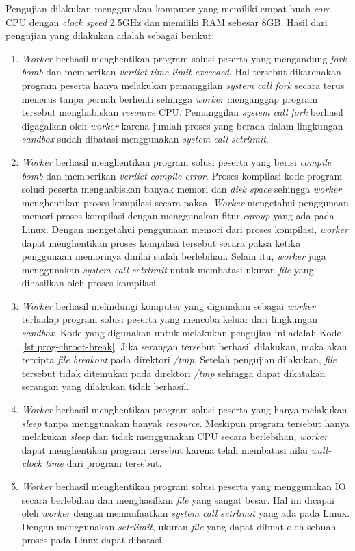 \par Pengujian dilakukan menggunakan komputer yang memiliki empat buah \textit{core} CPU dengan \textit{clock speed} 2.5GHz dan memiliki RAM sebesar 8GB. Hasil dari pengujian yang dilakukan adalah sebagai berikut:
\begin{enumerate}
  \item \textit{Worker} berhasil menghentikan program solusi peserta yang mengandung \textit{fork bomb} dan memberikan \textit{verdict} \textit{time limit exceeded}. Hal tersebut dikarenakan program peserta hanya melakukan pemanggilan \textit{system call fork} secara terus menerus tanpa pernah berhenti sehingga \textit{worker} menganggap program tersebut menghabiskan \textit{resource} CPU. Pemanggilan \textit{system call} \textit{fork} berhasil digagalkan oleh \textit{worker} karena jumlah proses yang berada dalam lingkungan \textit{sandbox} sudah dibatasi menggunakan \textit{system call} \textit{setrlimit}.
  \item \textit{Worker} berhasil menghentikan program solusi peserta yang berisi \textit{compile bomb} dan memberikan \textit{verdict} \textit{compile error}. Proses kompilasi kode program solusi peserta menghabiskan banyak memori dan \textit{disk space} sehingga \textit{worker} menghentikan proses kompilasi secara paksa. \textit{Worker} mengetahui penggunaan memori proses kompilasi dengan menggunakan fitur \textit{cgroup} yang ada pada Linux. Dengan mengetahui penggunaan memori dari proses kompilasi, \textit{worker} dapat menghentikan proses kompilasi tersebut secara paksa ketika penggunaan memorinya dinilai sudah berlebihan. Selain itu, \textit{worker} juga menggunakan \textit{system call setrlimit} untuk membatasi ukuran \textit{file} yang dihasilkan oleh proses kompilasi. 
  \item \textit{Worker} berhasil melindungi komputer yang digunakan sebagai \textit{worker} terhadap program solusi peserta yang mencoba keluar dari lingkungan \textit{sandbox}. Kode yang digunakan untuk melakukan pengujian ini adalah Kode \ref{lst:prog-chroot-break}. Jika serangan tersebut berhasil dilakukan, maka akan tercipta \textit{file breakout} pada direktori \textit{/tmp}. Setelah pengujian dilakukan, \textit{file} tersebut tidak ditemukan pada direktori \textit{/tmp} sehingga dapat dikatakan serangan yang dilakukan tidak berhasil.
  \item \textit{Worker} berhasil menghentikan program solusi peserta yang hanya melakukan \textit{sleep} tanpa menggunakan banyak \textit{resource}. Meskipun program tersebut hanya melakukan \textit{sleep} dan tidak menggunakan CPU secara berlebihan, \textit{worker} dapat menghentikan program tersebut karena telah membatasi nilai \textit{wall-clock time} dari program tersebut.
  \item \textit{Worker} berhasil menghentikan program solusi peserta yang menggunakan IO secara berlebihan dan menghasilkan \textit{file} yang sangat besar. Hal ini dicapai oleh \textit{worker} dengan memanfaatkan \textit{system call setrlimit} yang ada pada Linux. Dengan menggunakan \textit{setrlimit}, ukuran \textit{file} yang dapat dibuat oleh sebuah proses pada Linux dapat dibatasi.
\end{enumerate}

